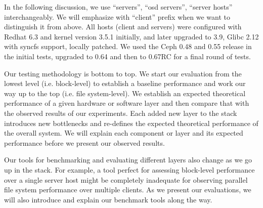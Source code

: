 In the following discussion, we use ``servers'', ``osd servers'', ``server
hosts'' interchangeably. We will emphasize with ``client'' prefix when we want
to distinguish it from above.  All hosts  (client and servers) were configured
with Redhat 6.3 and kernel version 3.5.1 initially, and later upgraded to 3.9,
Glibc 2.12 with syncfs support, locally patched.  We used the Ceph 0.48 and
0.55 release in the initial tests, upgraded to 0.64 and then to 0.67RC for a
final round of tests.

Our testing methodology is bottom to top. We start our evaluation from the
lowest level (i.e. block-level)  to establish a baseline performance and work
our way up to the top (i.e. file system-level). We establish an expected
theoretical performance of a given hardware or software layer and then compare
that with the observed results of our experiments. Each added new layer to the
stack introduces new bottlenecks and re-defines the expected theoretical
performance of the overall system. We will explain each component or layer and
its expected performance before we present our observed results.

Our tools for benchmarking and evaluating different layers also change as we
go up in the stack.  For example, a tool perfect for assessing block-level
performance over a single server host might be completely inadequate for
observing parallel file system performance over multiple clients. As we
present our evaluations, we will also introduce and explain our benchmark
tools along the way.
